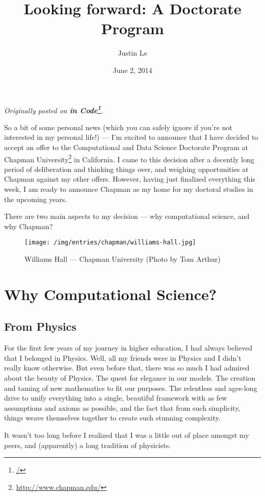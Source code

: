 \documentclass[]{article}
\title{Looking forward: A Doctorate Program}
\author{Justin Le}
\date{June 2, 2014}
\renewcommand{\href}[2]{#2\footnote{\url{#1}}}
\begin{document}
\maketitle

\emph{Originally posted on \textbf{\href{/}{in Code}}.}

So a bit of some personal news (which you can safely ignore if you're
not interested in my personal life!) --- I'm excited to announce that I
have decided to accept an offer to the Computational and Data Science
Doctorate Program at \href{http://www.chapman.edu/}{Chapman University}
in California. I came to this decision after a decently long period of
deliberation and thinking things over, and weighing opportunities at
Chapman against my other offers. However, having just finalized
everything this week, I am ready to announce Chapman as my home for my
doctoral studies in the upcoming years.

There are two main aspects to my decision --- why computational science,
and why Chapman?

\begin{figure}[htbp]
\centering
\texttt{[image: /img/entries/chapman/williams-hall.jpg]}
\caption{Williams Hall --- Chapman University (Photo by Tom Arthur)}
\end{figure}

\section{Why Computational Science?}\label{why-computational-science}

\subsection{From Physics}\label{from-physics}

For the first few years of my journey in higher education, I had always
believed that I belonged in Physics. Well, all my friends were in
Physics and I didn't really know otherwise. But even before that, there
was so much I had admired about the beauty of Physics. The quest for
elegance in our models. The creation and taming of new mathematics to
fit our purposes. The relentless and ages-long drive to unify everything
into a single, beautiful framework with as few assumptions and axioms as
possible, and the fact that from such simplicity, things weave
themselves together to create such stunning complexity.

It wasn't too long before I realized that I was a little out of place
amongst my peers, and (apparently) a long tradition of physicists.
\end{document}
